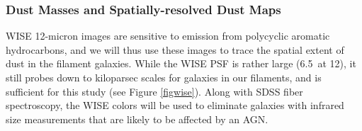 \documentclass[11pt, preprint]{aastex}
\begin{document}
{%




\vspace*{-1cm}
\subsubsection{Dust Masses and Spatially-resolved Dust Maps}
\vspace*{-.3cm}
\label{wise}
WISE 12-micron images are sensitive to emission from polycyclic
aromatic hydrocarbons, and we will thus use these images to trace the spatial extent of dust in the filament galaxies.  
While the WISE PSF is rather large
(6.5\arcsec \ at 12\micron), it
still probes down to kiloparsec scales for galaxies in our filaments,
and is sufficient for this study (see Figure \ref{figwise}).   Along with SDSS fiber
spectroscopy, the WISE colors will be used to eliminate galaxies with
infrared size measurements that are likely to be affected by an AGN.


}
\end{document}
